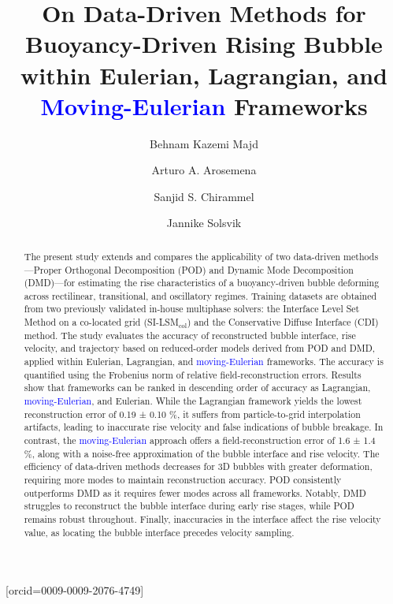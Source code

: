 \documentclass[a4paper,fleqn]{cas-sc}
\newcommand{\hl}[1]{\textcolor{blue}{#1}}
\newcommand{\hl}[1]{#1}
\begin{document}
	

	

	

	\title[mode=title]{On Data-Driven Methods for Buoyancy-Driven Rising Bubble within Eulerian, Lagrangian, and \hl{Moving-Eulerian} Frameworks}  
	
	

	\author[1]{Behnam Kazemi Majd}[orcid=0009-0009-2076-4749]
	\cormark[1]
	
	\author[1]{Arturo A. Arosemena}
	\author[1]{Sanjid S. Chirammel}
	\author[1]{Jannike Solsvik}
	



	
	
	
	\begin{abstract}
		The present study extends and compares the applicability of two data-driven methods—Proper Orthogonal Decomposition (POD) and Dynamic Mode Decomposition (DMD)—for estimating the rise characteristics of a buoyancy-driven bubble deforming across rectilinear, transitional, and oscillatory regimes. Training datasets are obtained from two previously validated in-house multiphase solvers: the  Interface Level Set Method on a co-located grid (SI-LSM$_{\text{col}}$) and the Conservative Diffuse Interface (CDI) method. The study evaluates the accuracy of reconstructed bubble interface, rise velocity, and trajectory based on reduced-order models derived from POD and DMD, applied within Eulerian, Lagrangian, and \hl{moving-Eulerian} frameworks. The accuracy is quantified using the Frobenius norm of relative field-reconstruction errors. Results show that frameworks can be ranked in descending order of accuracy as Lagrangian, \hl{moving-Eulerian}, and Eulerian. While the Lagrangian framework yields the lowest reconstruction error of 0.19 ± 0.10 \%, it suffers from particle-to-grid interpolation artifacts, leading to inaccurate rise velocity and false indications of bubble breakage. In contrast, the \hl{moving-Eulerian} approach offers a field-reconstruction error of 1.6 ± 1.4 \%, along with a noise-free approximation of the bubble interface and rise velocity. The efficiency of data-driven methods decreases for 3D bubbles with greater deformation, requiring more modes to maintain reconstruction accuracy. POD consistently outperforms DMD as it requires fewer modes across all frameworks. Notably, DMD struggles to reconstruct the bubble interface during early rise stages, while POD remains robust throughout. Finally, inaccuracies in the interface affect the rise velocity value, as locating the bubble interface precedes velocity sampling.
		
	\end{abstract}
	
\end{document}
